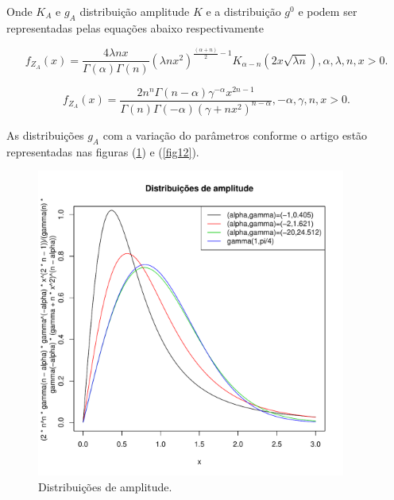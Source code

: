 \documentclass[12pt,a4paper]{article}
\begin{document}
Onde $K_{A}$ e $g_{A}$  distribuição amplitude $K$ e a distribuição $g^0$ e podem ser representadas pelas equações abaixo respectivamente

\begin{equation}\label{eqn112}
	f_{Z_{A}}(x)= \frac{4\lambda n x}{\Gamma(\alpha)\Gamma(n)}(\lambda n x^2)^{\frac{(\alpha+n)}{2}-1} K_{\alpha-n}(2x\sqrt{\lambda n}), \alpha,\lambda,n, x>0. 
\end{equation}

\begin{equation}\label{eqn113}
	f_{Z_{A}}(x)= \frac{2n^n\Gamma(n-\alpha)\gamma^{-\alpha}x^{2n-1}}{\Gamma(n)\Gamma(-\alpha)(\gamma+nx^2)^{n-\alpha}}, -\alpha,\gamma,n, x>0. 
\end{equation}


As distribuições $g_A$ com a variação do parâmetros conforme o artigo estão representadas nas figuras (\ref{fig11}) e (\ref{fig12}).


\begin{figure}[!htb]
\centering
\includegraphics[width=4.0in]{fig_eq_ga_fig1_frery_muller_1997.pdf}
	\caption{Distribuições de amplitude.}
\label{fig11}
\end{figure}
\end{document}
